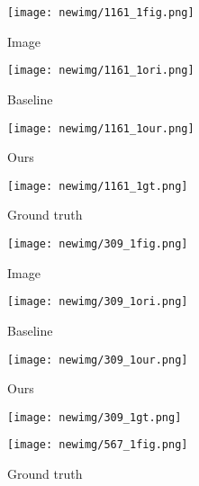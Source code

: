 \documentclass[journal]{IEEEtran}
\def\figheight{0.83}
\begin{document}
\begin{figure*}
	\centering
	
	\begin{minipage}[t]{\figheight\textwidth}
		\begin{minipage}[t]{0.23\textwidth}
			\centering
			\texttt{[image: newimg/1161\_1fig.png]}
			\caption*{Image}
		\end{minipage}
		\begin{minipage}[t]{0.23\textwidth}
			\centering
			\texttt{[image: newimg/1161\_1ori.png]}
			\caption*{Baseline}
		\end{minipage}
		\begin{minipage}[t]{0.23\textwidth}
			\centering
			\texttt{[image: newimg/1161\_1our.png]}
			\caption*{Ours}
		\end{minipage}
		\begin{minipage}[t]{0.23\textwidth}
			\centering
			\texttt{[image: newimg/1161\_1gt.png]}
			\caption*{Ground truth}
		\end{minipage}
	\end{minipage}
	\begin{minipage}[t]{\figheight\textwidth}
		\begin{minipage}[t]{0.23\textwidth}
			\centering
			\texttt{[image: newimg/309\_1fig.png]}
			\caption*{Image}
		\end{minipage}
		\begin{minipage}[t]{0.23\textwidth}
			\centering
			\texttt{[image: newimg/309\_1ori.png]}
			\caption*{Baseline}
		\end{minipage}
		\begin{minipage}[t]{0.23\textwidth}
			\centering
			\texttt{[image: newimg/309\_1our.png]}
			\caption*{Ours}
		\end{minipage}
		\begin{minipage}[t]{0.23\textwidth}
			\centering
			\texttt{[image: newimg/309\_1gt.png]}
			\caption*{Ground truth}
		\end{minipage}
	\end{minipage}
	\begin{minipage}[t]{\figheight\textwidth}
		\begin{minipage}[t]{0.23\textwidth}
			\centering
			\texttt{[image: newimg/567\_1fig.png]}

\end{minipage}
\end{minipage}
\end{figure*}
\end{document}
